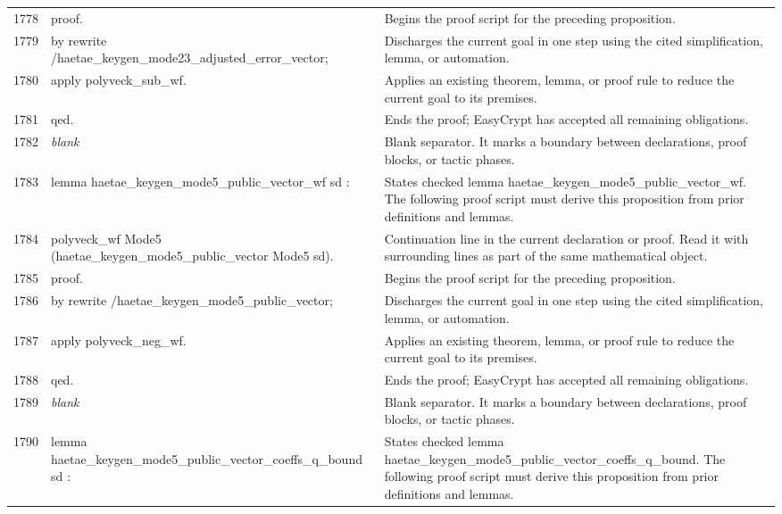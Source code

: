 \documentclass[10pt]{article}
\begin{document}
\begin{longtable}{r L{0.53\textwidth} L{0.37\textwidth}}
1778 & {\ttfamily\scriptsize proof.} & Begins the proof script for the preceding proposition. \\
1779 & {\ttfamily\scriptsize by rewrite /haetae\_keygen\_mode23\_adjusted\_error\_vector;} & Discharges the current goal in one step using the cited simplification, lemma, or automation. \\
1780 & {\ttfamily\scriptsize    apply polyveck\_sub\_wf.} & Applies an existing theorem, lemma, or proof rule to reduce the current goal to its premises. \\
1781 & {\ttfamily\scriptsize qed.} & Ends the proof; EasyCrypt has accepted all remaining obligations. \\
1782 & {\ttfamily\scriptsize \emph{blank}} & Blank separator.  It marks a boundary between declarations, proof blocks, or tactic phases. \\
1783 & {\ttfamily\scriptsize lemma haetae\_keygen\_mode5\_public\_vector\_wf sd :} & States checked lemma haetae\_keygen\_mode5\_public\_vector\_wf.  The following proof script must derive this proposition from prior definitions and lemmas. \\
1784 & {\ttfamily\scriptsize   polyveck\_wf Mode5 (haetae\_keygen\_mode5\_public\_vector Mode5 sd).} & Continuation line in the current declaration or proof.  Read it with surrounding lines as part of the same mathematical object. \\
1785 & {\ttfamily\scriptsize proof.} & Begins the proof script for the preceding proposition. \\
1786 & {\ttfamily\scriptsize by rewrite /haetae\_keygen\_mode5\_public\_vector;} & Discharges the current goal in one step using the cited simplification, lemma, or automation. \\
1787 & {\ttfamily\scriptsize    apply polyveck\_neg\_wf.} & Applies an existing theorem, lemma, or proof rule to reduce the current goal to its premises. \\
1788 & {\ttfamily\scriptsize qed.} & Ends the proof; EasyCrypt has accepted all remaining obligations. \\
1789 & {\ttfamily\scriptsize \emph{blank}} & Blank separator.  It marks a boundary between declarations, proof blocks, or tactic phases. \\
1790 & {\ttfamily\scriptsize lemma haetae\_keygen\_mode5\_public\_vector\_coeffs\_q\_bound sd :} & States checked lemma haetae\_keygen\_mode5\_public\_vector\_coeffs\_q\_bound.  The following proof script must derive this proposition from prior definitions and lemmas. \\

\end{longtable}
\end{document}
